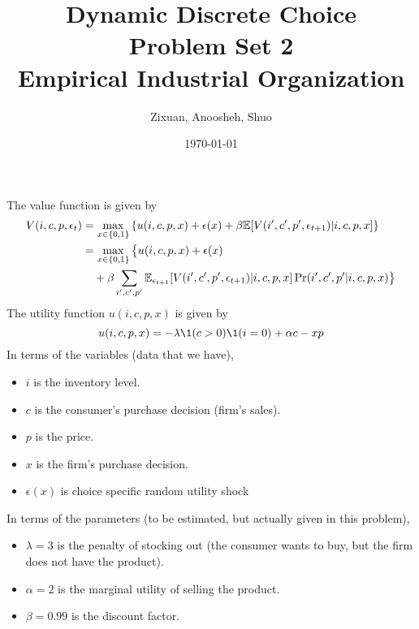 \documentclass[12pt]{article}[margin=1in]
\title{\textbf{Dynamic Discrete Choice} \\
\vspace{.3cm}
\large Problem Set 2 \\
Empirical Industrial Organization}
\author{Zixuan, Anoosheh, Shuo}
\date{\today}
\begin{document}
\maketitle

\setcounter{page}{1}

The value function is given by
\begin{equation*}
    \begin{split}
        V(i,c,p,\epsilon_t) & = \max_{x \in \{0,1\}} \left\{ u(i,c,p,x) + \epsilon(x)+ \beta \mathbb{E}[V(i',c',p',\epsilon_{t+1})|i,c,p,x] \right\}     \\
                            & = \max_{x \in \{0,1\}} \big\{ u(i,c,p,x) + \epsilon(x)                                                             \\
                            & \quad + \beta \sum_{i',c',p'}\mathbb{E}_{\epsilon_{t+1}}[V(i',c',p',\epsilon_{t+1})|i,c,p,x] \Pr(i', c',p'|i,c,p,x) \big\}
    \end{split}
\end{equation*}
The utility function $u(i,c,p,x)$ is given by
\begin{equation*}
    u(i,c,p,x) = -\lambda \1(c>0)\1(i=0) + \alpha c -xp
\end{equation*}
In terms of the variables (data that we have),
\begin{itemize}
    \item $i$ is the inventory level.
    \item $c$ is the consumer's purchase decision (firm's sales).
    \item $p$ is the price.
    \item $x$ is the firm's purchase decision.
    \item $\epsilon(x)$ is choice specific random utility shock
\end{itemize}
In terms of the parameters (to be estimated, but actually given in this problem),
\begin{itemize}
    \item $\lambda=3$ is the penalty of stocking out (the consumer wants to buy, but the firm does not have the product).
    \item $\alpha=2$ is the marginal utility of selling the product.
    \item $\beta=0.99$ is the discount factor.
\end{itemize}
\end{document}
